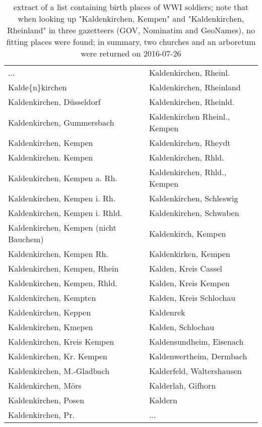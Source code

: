 \documentclass[11pt]{article}
\begin{document}
\begin{table*}
  \centering
  \begin{tabular}{l|l}
... &Kaldenkirchen, Rheinl.\\
Kalde\{n\}kirchen&Kaldenkirchen, Rheinland\\
Kaldenkirchen, Düsseldorf&Kaldenkirchen, Rheinld.\\
Kaldenkirchen, Gummersbach&Kaldenkirchen Rheinl., Kempen\\
Kaldenkirchen, Kempen&Kaldenkirchen, Rheydt\\
Kaldenkirchen. Kempen&Kaldenkirchen, Rhld.\\
Kaldenkirchen, Kempen a. Rh.&Kaldenkirchen, Rhld., Kempen\\
Kaldenkirchen, Kempen i. Rh.&Kaldenkirchen, Schleswig\\
Kaldenkirchen, Kempen i. Rhld.&Kaldenkirchen, Schwaben\\
Kaldenkirchen, Kempen (nicht Bauchem)&Kaldenkirch, Kempen\\
Kaldenkirchen, Kempen Rh.&Kaldenkirken, Kempen\\
Kaldenkirchen, Kempen, Rhein&Kalden, Kreis Cassel\\
Kaldenkirchen, Kempen, Rhld.&Kalden, Kreis Kempen\\
Kaldenkirchen, Kempten&Kalden, Kreis Schlochau\\
Kaldenkirchen, Keppen&Kaldenrek\\
Kaldenkirchen, Kmepen&Kalden, Schlochau\\
Kaldenkirchen, Kreis Kempen&Kaldensundheim, Eisenach\\
Kaldenkirchen, Kr. Kempen&Kaldenwertheim, Dermbach\\
Kaldenkirchen, M.-Gladbach&Kalderfeld, Waltershausen\\
Kaldenkirchen, Mörs&Kalderlah, Gifhorn\\
Kaldenkirchen, Posen&Kaldern\\
Kaldenkirchen, Pr.& ... \\
  \end{tabular}
  \caption{extract of a list containing birth places of WWI soldiers; note that when looking up "Kaldenkirchen, Kempen" and "Kaldenkirchen, Rheinland" in three gazetteers (GOV, Nominatim and GeoNames), no fitting places were found; in summary, two churches and an arboretum were returned on 2016-07-26}
  \label{tab:kaldenkirchen}
\end{table*}
\newpage

\end{document}
